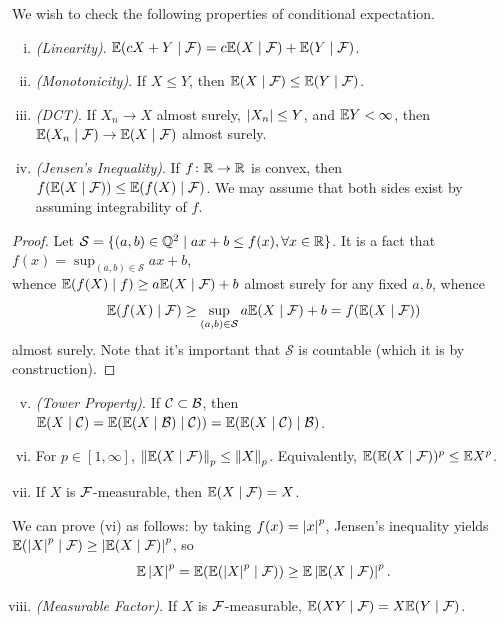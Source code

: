 \newpage
We wish to check the following properties of conditional expectation.
\begin{enumerate}[(i)]
    \item \textit{(Linearity)}. $\mathbb E(cX + Y \mid \mathcal F) = c \mathbb E(X \mid \mathcal F) + \mathbb E(Y \mid \mathcal F)$.
    \item \textit{(Monotonicity)}. If $X \leq Y$, then $\mathbb E(X \mid \mathcal F) \leq \mathbb E(Y \mid \mathcal F)$.
    \item \textit{(DCT)}. If $X_n \to X$ almost surely, $\left\lvert X_n \right\rvert \leq Y$, and $\mathbb E Y < \infty$, then $\mathbb E(X_n \mid \mathcal F) \to \mathbb E(X \mid \mathcal F)$ almost surely.
    \item \textit{(Jensen's Inequality)}. If $f \colon \mathbb R \to \mathbb R$ is convex, then $f(\mathbb E(X \mid \mathcal F)) \leq \mathbb E(f(X) \mid \mathcal F)$. We may assume that both sides exist by assuming integrability of $f$.
\end{enumerate}
\begin{proof}
    Let $\mathcal S = \{(a, b) \in \mathbb Q^2 \mid ax + b \leq f(x), \forall x \in \mathbb R\}$. It is a fact that $f(x) = \sup_{(a, b) \in \mathcal S} ax + b$, \\ whence $\mathbb E(f(X) \mid f) \geq a \mathbb E(X \mid \mathcal F) + b$ almost surely for any fixed $a, b$, whence 
    \[ \mathbb E (f(X) \mid \mathcal F) \geq \sup_{(a, b) \in \mathcal S} a \mathbb E(X \mid \mathcal F) + b = f(\mathbb E(X \mid \mathcal F)) \]
    almost surely. Note that it's important that $\mathcal S$ is countable (which it is by construction).
\end{proof}
\begin{enumerate}[(i)] \setcounter{enumi}{4}
    \item \textit{(Tower Property)}. If $\mathcal C \subset \mathcal B$, then $\mathbb E(X \mid \mathcal C) = \mathbb E(\mathbb E(X \mid \mathcal B) \mid \mathcal C)) = \mathbb E(\mathbb E(X \mid \mathcal C) \mid \mathcal B)$.
    \item For $p \in [1, \infty]$, $\left\lVert \mathbb E(X \mid \mathcal F) \right\rVert_p \leq \left\lVert X \right\rVert_p$. Equivalently, $\mathbb E(\mathbb E(X \mid \mathcal F))^p \leq \mathbb E X^p$.
    \item If $X$ is $\mathcal F$-measurable, then $\mathbb E(X \mid \mathcal F) = X$.
\end{enumerate}
We can prove (vi) as follows: by taking $f(x) = \left\lvert x \right\rvert^p$, Jensen's inequality yields $\mathbb E(\left\lvert X \right\rvert^p \mid \mathcal F) \geq \left\lvert \mathbb E(X \mid \mathcal F) \right\rvert^p$, so
\[ \mathbb E \left\lvert X \right\rvert^p = \mathbb E(\mathbb E(\left\lvert X \right\rvert^p \mid \mathcal F)) \geq \mathbb E \left\lvert \mathbb E(X \mid \mathcal F) \right\rvert^p. \]
\begin{enumerate}[(i)] \setcounter{enumi}{7}
    \item \textit{(Measurable Factor)}. If $X$ is $\mathcal F$-measurable, $\mathbb E(XY \mid \mathcal F) = X \mathbb E(Y \mid \mathcal F)$.
\end{enumerate}

